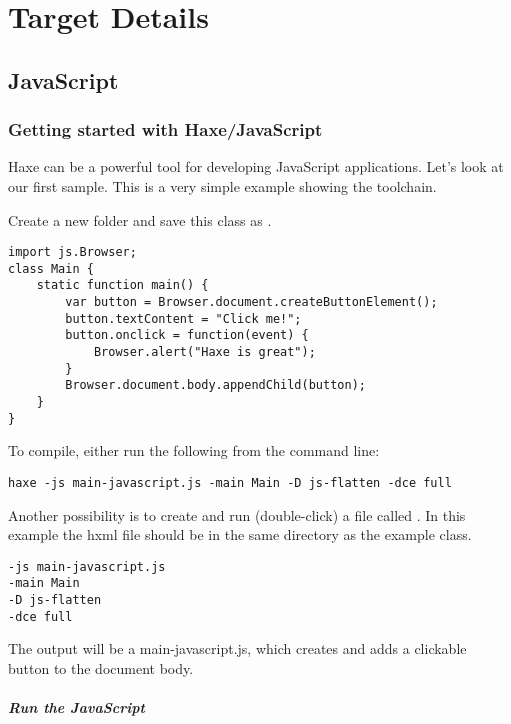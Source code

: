 \chapter{Target Details}
\label{target-details}

\section{JavaScript}
\label{target-javascript}

\subsection{Getting started with Haxe/JavaScript}
\label{target-javascript-getting-started}

Haxe can be a powerful tool for developing JavaScript applications. Let's look at our first sample.
This is a very simple example showing the toolchain. 

Create a new folder and save this class as .

\begin{lstlisting}
import js.Browser;
class Main {
    static function main() {
        var button = Browser.document.createButtonElement();
        button.textContent = "Click me!";
        button.onclick = function(event) {
            Browser.alert("Haxe is great");
        }
        Browser.document.body.appendChild(button);
    }
}
\end{lstlisting}

To compile, either run the following from the command line:

\begin{lstlisting}
haxe -js main-javascript.js -main Main -D js-flatten -dce full
\end{lstlisting}

Another possibility is to create and run (double-click) a file called . In this example the hxml file should be in the same directory as the example class.

\begin{lstlisting}
-js main-javascript.js
-main Main
-D js-flatten
-dce full
\end{lstlisting}

The output will be a main-javascript.js, which creates and adds a clickable button to the document body.

\paragraph{Run the JavaScript}

